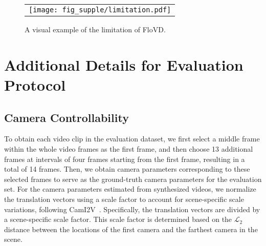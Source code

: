 \begin{table}[!t]
\centering
{}
\vspace{-3mm}
\caption{
Analysis of employing different timestep sampling strategies for camera controllability.
}
\vspace{-4mm}
\label{table:timestep_strategy}
\end{table}



\begin{figure*}[!t]
\centering
\begin{tabular}{@{}c}
\texttt{[image: fig\_supple/limitation.pdf]} \\
\end{tabular}
\vspace{-3mm}
\caption{
A visual example of the limitation of FloVD.
}
\label{fig:limitation}
\end{figure*}

\section{Additional Details for Evaluation Protocol}
\subsection{Camera Controllability}
To obtain each video clip in the evaluation dataset, we first select a middle frame within the whole video frames as the first frame, and then choose 13 additional frames at intervals of four frames starting from the first frame, resulting in a total of 14 frames.
Then, we obtain camera parameters corresponding to these selected frames to serve as the ground-truth camera parameters for the evaluation set.
For the camera parameters estimated from synthesized videos, we normalize the translation vectors using a scale factor to account for scene-specific scale variations, following CamI2V~\cite{zheng2024cami2v}.
Specifically, the translation vectors are divided by a scene-specific scale factor.
This scale factor is determined based on the $\mathcal{L}_2$ distance between the locations of the first camera and the farthest camera in the scene.


